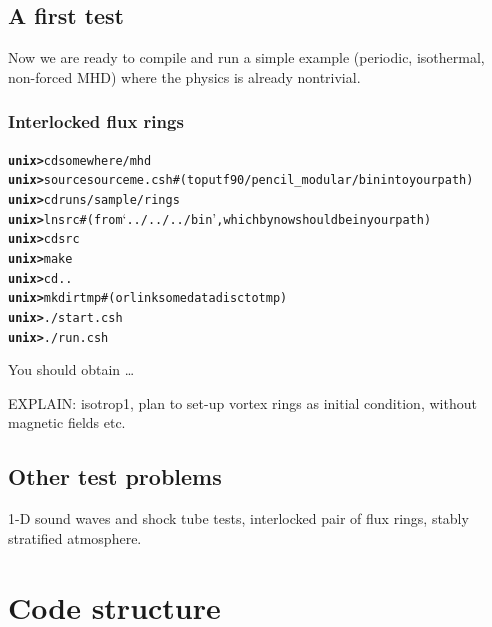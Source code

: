 \documentclass[12pt,twoside,notitlepage,a4paper]{article}
\newcommand{\prompt}[1]{{\ttfamily\bfseries{}#1}}
\newcommand{\file}[1]{`\texttt{#1}'}
\begin{document}

\subsection{A first test}

Now we are ready to compile and run a simple example (periodic,
isothermal, non-forced MHD) where the physics is already nontrivial.


\subsubsection{Interlocked flux rings}

\begin{alltt}
  \prompt{unix> } cd somewhere/mhd
  \prompt{unix> } source sourceme.csh \quad\#(to put f90/pencil_modular/bin into your path)
  \prompt{unix> } cd runs/sample/rings
  \prompt{unix> } lnsrc \quad\#(from \file{../../../bin}, which by now should be in your path)
  \prompt{unix> } cd src
  \prompt{unix> } make
  \prompt{unix> } cd ..
  \prompt{unix> } mkdir tmp \quad\#(or link some data disc to tmp)
  \prompt{unix> } ./start.csh
  \prompt{unix> } ./run.csh
\end{alltt}

You should obtain \ldots

\vspace{5cm}

EXPLAIN: isotrop1, plan to set-up vortex rings as initial condition,
without magnetic fields etc.


\subsection{Other test problems}

1-D sound waves and shock tube tests, interlocked pair of flux rings, stably stratified atmosphere.



\section{Code structure}

\end{document}
